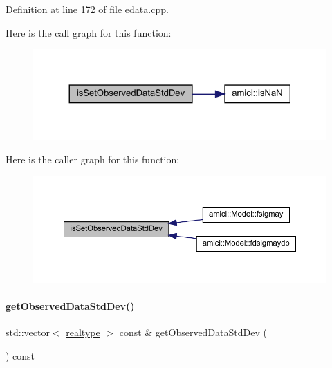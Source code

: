 Definition at line 172 of file edata.\+cpp.

Here is the call graph for this function\+:
\nopagebreak
\begin{figure}[H]
\begin{center}
\leavevmode
\includegraphics[width=324pt]{classamici_1_1_exp_data_a75808a32f77afa60bb736a1dfbce9aba_cgraph}
\end{center}
\end{figure}
Here is the caller graph for this function\+:
\nopagebreak
\begin{figure}[H]
\begin{center}
\leavevmode
\includegraphics[width=350pt]{classamici_1_1_exp_data_a75808a32f77afa60bb736a1dfbce9aba_icgraph}
\end{center}
\end{figure}
\mbox{\label{classamici_1_1_exp_data_ada8a2eebadd4eba1a7c3fa1a014a76d0}} 
\paragraph{\texorpdfstring{get\+Observed\+Data\+Std\+Dev()}{getObservedDataStdDev()}}
{\footnotesize\ttfamily std\+::vector$<$ \mbox{\hyperlink{namespaceamici_a1bdce28051d6a53868f7ccbf5f2c14a3}{realtype}} $>$ const  \& get\+Observed\+Data\+Std\+Dev (\begin{DoxyParamCaption}{ }\end{DoxyParamCaption}) const}


